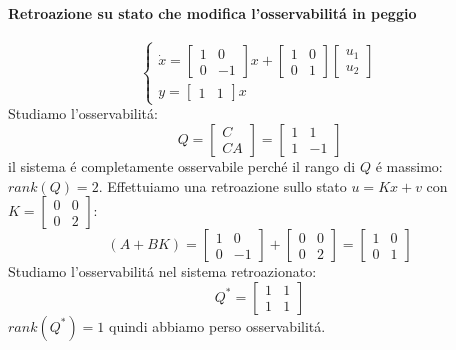 \documentclass[../main.tex]{subfiles}
\begin{document}
		\begin{mdframed}[style=Esempio]
			\paragraph{Retroazione su stato che modifica l'osservabilit\'a in peggio}
			\[
				\begin{cases}
					\dot x =
					\begin{bmatrix}
						1 & 0\\
						0 & -1
					\end{bmatrix} x +
					\begin{bmatrix}
						1 & 0\\
						0 & 1
					\end{bmatrix}
					\begin{bmatrix}
						u_1\\
						u_2
					\end{bmatrix}
					\\[1em]
					y =
					\begin{bmatrix}
						1 & 1
					\end{bmatrix} x
				\end{cases}
			\]
			Studiamo l'osservabilit\'a:
			\[
				Q =
				\begin{bmatrix}
					C\\
					CA
				\end{bmatrix} =
				\begin{bmatrix}
					1 & 1\\
					1 & -1
				\end{bmatrix}
			\]
			il sistema \'e completamente osservabile perch\'e il rango di $ Q $ \'e massimo: $ rank(Q) = 2 $. Effettuiamo una retroazione sullo stato $ u = Kx + v $ con $ K = \begin{bmatrix} 0 & 0\\ 0 & 2 \end{bmatrix} $:
			\[
				(A+BK) =
				\begin{bmatrix}
					1 & 0\\
					0 & -1
				\end{bmatrix} +
				\begin{bmatrix}
					0 & 0\\
					0 & 2
				\end{bmatrix} =
				\begin{bmatrix}
					1 & 0\\
					0 & 1
				\end{bmatrix}
			\]
			Studiamo l'osservabilit\'a nel sistema retroazionato:
			\[
				Q^{*} =
				\begin{bmatrix}
					1 & 1\\
					1 & 1
				\end{bmatrix}
			\]
			$ rank(Q^{*}) = 1 $ quindi abbiamo perso osservabilit\'a.
		\end{mdframed}
		
\end{document}
